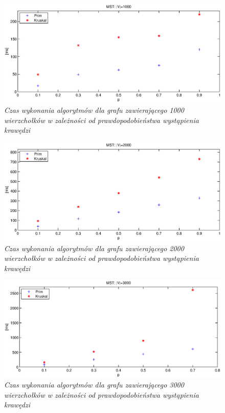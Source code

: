 \documentclass[a4paper, 10pt]{article}
\begin{document}
\begin{figure}[ht!]
\centering
\includegraphics[width=165mm]{wykresy/v1000.eps}
\caption{\it{Czas wykonania algorytmów dla grafu zawierającego 1000 wierzchołków w zależności od prawdopodobieństwa wystąpienia krawędzi}}
\label{overflow}
\end{figure}

\begin{figure}[ht!]
\centering
\includegraphics[width=165mm]{wykresy/v2000.eps}
\caption{\it{Czas wykonania algorytmów dla grafu zawierającego 2000 wierzchołków w zależności od prawdopodobieństwa wystąpienia krawędzi }}
\label{overflow}
\end{figure}

\begin{figure}[ht!]
\centering
\includegraphics[width=165mm]{wykresy/v3000.eps}
\caption{\it{Czas wykonania algorytmów dla grafu zawierającego 3000 wierzchołków w zależności od prawdopodobieństwa wystąpienia krawędzi }}
\label{overflow}
\end{figure}
\end{document}
